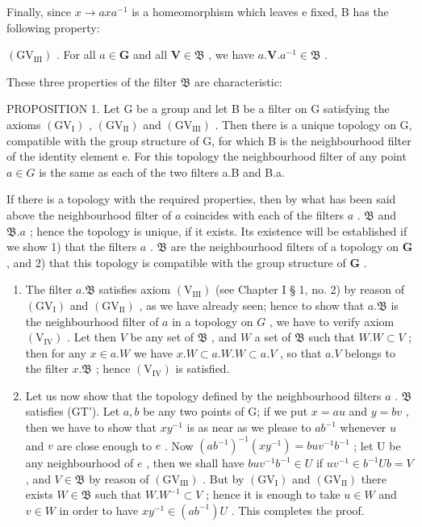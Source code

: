 Finally, since \(x \rightarrow axa^{-1}\) is a homeomorphism which leaves e fixed, B has the following property:

\((\mathrm{GV}_{\mathrm{III}})\) . For all \(a \in \mathbf{G}\) and all \(\mathbf{V} \in \mathfrak{B}\) , we have \(a. \mathbf{V}.a^{-1} \in \mathfrak{B}\) .

These three properties of the filter \(\mathfrak{B}\) are characteristic:

PROPOSITION 1. Let G be a group and let B be a filter on G satisfying the axioms \((\mathrm{GV}_{\mathrm{I}})\) , \((\mathrm{GV}_{\mathrm{II}})\) and \((\mathrm{GV}_{\mathrm{III}})\) . Then there is a unique topology on G, compatible with the group structure of G, for which B is the neighbourhood filter of the identity element e. For this topology the neighbourhood filter of any point \(a \in G\) is the same as each of the two filters a.B and B.a.

If there is a topology with the required properties, then by what has been said above the neighbourhood filter of \(a\) coincides with each of the filters \(a\) . \(\mathfrak{B}\) and \(\mathfrak{B}.a\) ; hence the topology is unique, if it exists. Its existence will be established if we show 1) that the filters \(a\) . \(\mathfrak{B}\) are the neighbourhood filters of a topology on \(\mathbf{G}\) , and 2) that this topology is compatible with the group structure of \(\mathbf{G}\) .

\begin{enumerate}
\def\labelenumi{\arabic{enumi})}
\item
  The filter \(a. \mathfrak{B}\) satisfies axiom \((\mathrm{V}_{\mathrm{III}})\) (see Chapter I § 1, no. 2) by reason of \((\mathrm{GV}_{\mathrm{I}})\) and \((\mathrm{GV}_{\mathrm{II}})\) , as we have already seen; hence to show that \(a. \mathfrak{B}\) is the neighbourhood filter of \(a\) in a topology on \(G\) , we have to verify axiom \((\mathrm{V}_{\mathrm{IV}})\) . Let then \(V\) be any set of \(\mathfrak{B}\) , and \(W\) a set of \(\mathfrak{B}\) such that \(W.W \subset V\) ; then for any \(x \in a.W\) we have \(x.W \subset a.W.W \subset a.V\) , so that \(a.V\) belongs to the filter \(x. \mathfrak{B}\) ; hence \((\mathrm{V}_{\mathrm{IV}})\) is satisfied.
\item
  Let us now show that the topology defined by the neighbourhood filters \(a\) . \(\mathfrak{B}\) satisfies (GT'). Let \(a, b\) be any two points of G; if we put \(x = au\) and \(y = bv\) , then we have to show that \(xy^{-1}\) is as near as we please to \(ab^{-1}\) whenever \(u\) and \(v\) are close enough to \(e\) . Now \((ab^{-1})^{-1}(xy^{-1}) = buv^{-1}b^{-1}\) ; let U be any neighbourhood of \(e\) , then we shall have \(buv^{-1}b^{-1} \in U\) if \(uv^{-1} \in b^{-1}Ub = V\) , and \(V \in \mathfrak{B}\) by reason of \((\mathrm{GV}_{\mathrm{III}})\) . But by \((\mathrm{GV}_{\mathrm{I}})\) and \((\mathrm{GV}_{\mathrm{II}})\) there exists \(W \in \mathfrak{B}\) such that \(W.W^{-1} \subset V\) ; hence it is enough to take \(u \in W\) and \(v \in W\) in order to have \(xy^{-1} \in (ab^{-1})U\) . This completes the proof.
\end{enumerate}

